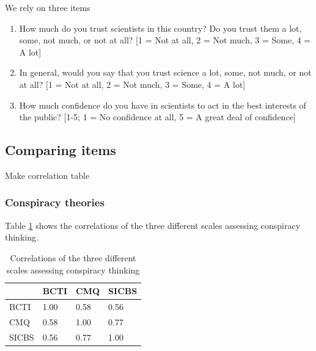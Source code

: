 \documentclass[
  doc,floatsintext]{apa6}
\begin{document}
We rely on three items

\begin{enumerate}
\def\labelenumi{\arabic{enumi}.}
\item
  How much do you trust scientists in this country? Do you trust them a lot, some, not much, or not at all? {[}1 = Not at all, 2 = Not much, 3 = Some, 4 = A lot{]}
\item
  In general, would you say that you trust science a lot, some, not much, or not at all? {[}1 = Not at all, 2 = Not much, 3 = Some, 4 = A lot{]}
\item
  How much confidence do you have in scientists to act in the best interests of the public? {[}1-5; 1 = No confidence at all, 5 = A great deal of confidence{]}
\end{enumerate}

\hypertarget{comparing-items}{%
\subsection{Comparing items}\label{comparing-items}}

Make correlation table

\hypertarget{conspiracy-theories}{%
\subsubsection{Conspiracy theories}\label{conspiracy-theories}}

Table \ref{tab:correlation-conspiracy} shows the correlations of the three different scales assessing conspiracy thinking.

\begin{table}[h]

\begin{center}
\begin{threeparttable}

\caption{\label{tab:correlation-conspiracy}Correlations of the three different scales assessing conspiracy thinking}

\begin{tabular}{llll}
\toprule
 & \multicolumn{1}{c}{BCTI} & \multicolumn{1}{c}{CMQ} & \multicolumn{1}{c}{SICBS}\\
\midrule
BCTI & 1.00 & 0.58 & 0.56\\
CMQ & 0.58 & 1.00 & 0.77\\
SICBS & 0.56 & 0.77 & 1.00\\
\bottomrule
\end{tabular}

\end{threeparttable}
\end{center}

\end{table}
\end{document}
